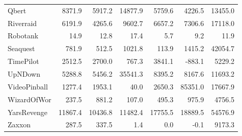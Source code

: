 \begin{table}[H]
{\begin{tabular}{lrrrrrr}
Qbert          &     8371.9 &    5917.2 &                14877.9 &    5759.6 &          4226.5 &  13455.0 \\
Riverraid      &     6191.9 &    4265.6 &                 9602.7 &    6657.2 &          7306.6 &  17118.0 \\
Robotank       &       14.9 &      12.8 &                   17.4 &       5.7 &             9.2 &     11.9 \\
Seaquest       &      781.9 &     512.5 &                 1021.8 &     113.9 &          1415.2 &  42054.7 \\
TimePilot      &     2512.5 &    2700.0 &                  767.3 &    3841.1 &          -883.1 &   5229.2 \\
UpNDown        &     5288.8 &    5456.2 &                35541.3 &    8395.2 &          8167.6 &  11693.2 \\
VideoPinball   &     1277.4 &    1953.1 &                   40.0 &    2650.3 &         85351.0 &  17667.9 \\
WizardOfWor    &      237.5 &     881.2 &                  107.0 &     495.3 &           975.9 &   4756.5 \\
YarsRevenge    &    11867.4 &   10436.8 &                11482.4 &   17755.5 &         18889.5 &  54576.9 \\
Zaxxon         &      287.5 &     337.5 &                    1.4 &       0.0 &            -0.1 &   9173.3 \\
\bottomrule
\end{tabular}}
\end{table}


